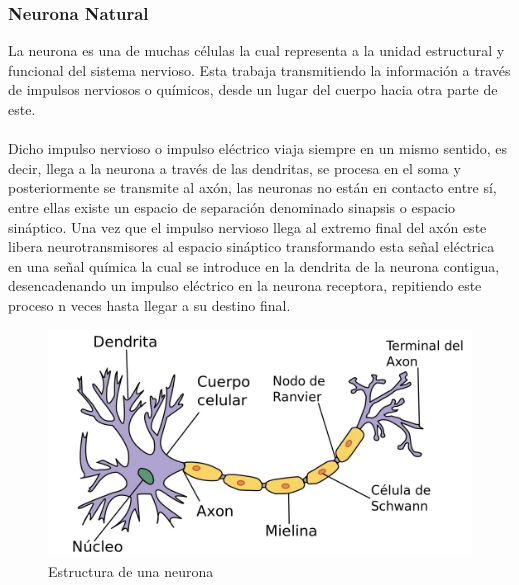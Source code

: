 \documentclass[12pt, a4paper, titlepage]{report}
\begin{document}
						\subsubsection*{Neurona Natural}
						La neurona es una de muchas células la cual representa a la unidad estructural y funcional del sistema nervioso. Esta trabaja transmitiendo la información a través de impulsos nerviosos o químicos, desde un lugar del cuerpo hacia otra parte de este.\\\\
						Dicho impulso nervioso o impulso eléctrico viaja siempre en un mismo sentido, es decir, llega a la neurona a través de las dendritas, se procesa en el soma y posteriormente se transmite al axón, las neuronas no están en contacto entre sí, entre ellas existe un espacio de separación denominado sinapsis o espacio sináptico. Una vez que el impulso nervioso llega al extremo final del axón este libera neurotransmisores al espacio sináptico transformando esta señal eléctrica en una señal química la cual se introduce en la dendrita de la neurona contigua, desencadenando un impulso eléctrico en la neurona receptora, repitiendo este proceso n veces hasta llegar a su destino final.\cite{refNeuronaNat}
						\begin{figure}[H] \caption{Estructura de una neurona \cite{refNeuronaNat2}}
							\includegraphics[width=12cm]{./imagenes/MarcoTeorico/Neurona.jpg}
							\centering 
						\end{figure}			
\end{document}
